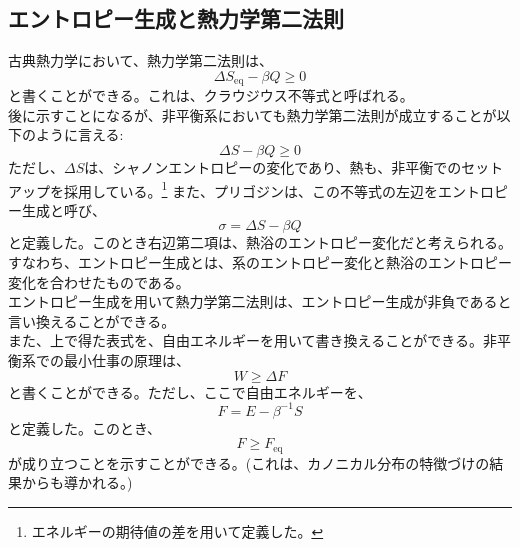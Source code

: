 \documentclass[a4paper,11pt]{jsarticle}
\numberwithin{equation}{section}
\begin{document}
\subsection{エントロピー生成と熱力学第二法則}
古典熱力学において、熱力学第二法則は、
\begin{equation}
    \Delta S_{\text{eq}} -\beta Q \geq 0
\end{equation}
と書くことができる。これは、クラウジウス不等式と呼ばれる。\\
後に示すことになるが、非平衡系においても熱力学第二法則が成立することが以下のように言える:
\begin{equation}
    \Delta S -\beta Q \geq 0
\end{equation}
ただし、$\Delta S$は、シャノンエントロピーの変化であり、熱も、非平衡でのセットアップを採用している。\footnote{エネルギーの期待値の差を用いて定義した。} 
また、プリゴジンは、この不等式の左辺をエントロピー生成と呼び、
\begin{equation}
    \sigma = \Delta S -\beta Q
\end{equation}
と定義した。このとき右辺第二項は、熱浴のエントロピー変化だと考えられる。すなわち、エントロピー生成とは、系のエントロピー変化と熱浴のエントロピー変化を合わせたものである。\\
エントロピー生成を用いて熱力学第二法則は、エントロピー生成が非負であると言い換えることができる。\\

また、上で得た表式を、自由エネルギーを用いて書き換えることができる。非平衡系での最小仕事の原理は、
\begin{equation}
    W \geq \Delta F
\end{equation}
と書くことができる。ただし、ここで自由エネルギーを、
\begin{equation}
    F = E - \beta^{-1}S
\end{equation}
と定義した。このとき、
\begin{equation}
    F \geq F_{\text{eq}}
\end{equation}
が成り立つことを示すことができる。(これは、カノニカル分布の特徴づけの結果からも導かれる。)\\
\end{document}
